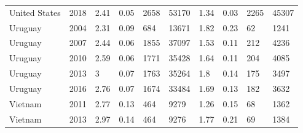 \begin{tabular}{llllllllll}
United States & 2018 & 2.41 & 0.05 & 2658 & 53170 & 1.34 & 0.03 & 2265 & 45307 \\ 
Uruguay & 2004 & 2.31 & 0.09 & 684 & 13671 & 1.82 & 0.23 & 62 & 1241 \\ 
Uruguay & 2007 & 2.44 & 0.06 & 1855 & 37097 & 1.53 & 0.11 & 212 & 4236 \\ 
Uruguay & 2010 & 2.59 & 0.06 & 1771 & 35428 & 1.64 & 0.11 & 204 & 4085 \\ 
Uruguay & 2013 & 3 & 0.07 & 1763 & 35264 & 1.8 & 0.14 & 175 & 3497 \\ 
Uruguay & 2016 & 2.76 & 0.07 & 1674 & 33484 & 1.69 & 0.13 & 182 & 3632 \\ 
Vietnam & 2011 & 2.77 & 0.13 & 464 & 9279 & 1.26 & 0.15 & 68 & 1362 \\ 
Vietnam & 2013 & 2.97 & 0.14 & 464 & 9276 & 1.77 & 0.21 & 69 & 1384 \\ 
\hline 
\end{tabular}